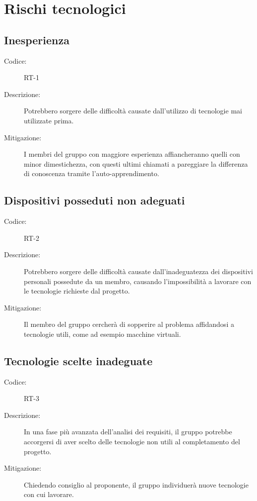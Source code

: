 \section{Rischi tecnologici}

\subsection*{Inesperienza}
\begin{description}
    \item[Codice:] RT-1
    \item[Descrizione:] Potrebbero sorgere delle difficoltà causate dall'utilizzo di tecnologie mai utilizzate prima.
    \item[Mitigazione:] I membri del gruppo con maggiore esperienza affiancheranno quelli con minor dimestichezza, con questi ultimi chiamati a pareggiare la differenza di conoscenza tramite l'auto-apprendimento.
\end{description}

\subsection*{Dispositivi posseduti non adeguati}
\begin{description}
    \item[Codice:] RT-2
    \item[Descrizione:] Potrebbero sorgere delle difficoltà causate dall'inadeguatezza dei dispositivi personali possedute da un membro, causando l'impossibilità a lavorare con le tecnologie richieste dal progetto.
    \item[Mitigazione:] Il membro del gruppo cercherà di sopperire al problema affidandosi a tecnologie utili, come ad esempio macchine virtuali.
\end{description}

\subsection*{Tecnologie scelte inadeguate}
\begin{description}
    \item[Codice:] RT-3
    \item[Descrizione:] In una fase più avanzata dell'analisi dei requisiti, il gruppo potrebbe accorgersi di aver scelto delle tecnologie non utili al completamento del progetto.
    \item[Mitigazione:] Chiedendo consiglio al proponente, il gruppo individuerà nuove tecnologie con cui lavorare.
\end{description}

